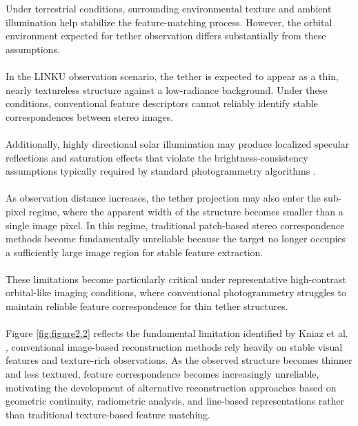 Under terrestrial conditions, surrounding environmental texture and ambient illumination help stabilize the feature-matching process. However, the orbital environment expected for tether observation differs substantially from these assumptions.
\\\\
In the LINKU observation scenario, the tether is expected to appear as a thin, nearly textureless structure against a low-radiance background. Under these conditions, conventional feature descriptors cannot reliably identify stable correspondences between stereo images.
\\\\
Additionally, highly directional solar illumination may produce localized specular reflections and saturation effects that violate the brightness-consistency assumptions typically required by standard photogrammetry algorithms \cite{kniaz2020wire, yu2023bonding}.
\\\\
As observation distance increases, the tether projection may also enter the sub-pixel regime, where the apparent width of the structure becomes smaller than a single image pixel. In this regime, traditional patch-based stereo correspondence methods become fundamentally unreliable because the target no longer occupies a sufficiently large image region for stable feature extraction.
\\\\
These limitations become particularly critical under representative high-contrast orbital-like imaging conditions, where conventional photogrammetry struggles to maintain reliable feature correspondence for thin tether structures.
\\\\
Figure \ref{fig:figure2.2} reflects the fundamental limitation identified by Kniaz et al. \cite{kniaz2020wire}, conventional image-based reconstruction methods rely heavily on stable visual features and texture-rich observations. As the observed structure becomes thinner and less textured, feature correspondence becomes increasingly unreliable, motivating the development of alternative reconstruction approaches based on geometric continuity, radiometric analysis, and line-based representations rather than traditional texture-based feature matching.
\newpage
\clearpage

